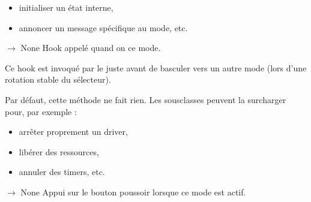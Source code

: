 \documentclass[letterpaper,10pt,french]{sphinxmanual}
\begin{document}
\begin{fulllineitems}
\begin{fulllineitems}
\begin{itemize}
\item {} 
\sphinxAtStartPar
initialiser un état interne,

\item {} 
\sphinxAtStartPar
annoncer un message spécifique au mode, etc.

\end{itemize}

\end{fulllineitems}


\begin{fulllineitems}
\label{\detokenize{api/core:core.mode_base.Mode.on_exit}}
\pysigstartsignatures
\pysiglinewithargsret
{}
{}
{{ $\rightarrow$ None}}
\pysigstopsignatures
\sphinxAtStartPar
Hook appelé quand on  ce mode.

\sphinxAtStartPar
Ce hook est invoqué par le  juste avant de basculer
vers un autre mode (lors d’une rotation stable du sélecteur).

\sphinxAtStartPar
Par défaut, cette méthode ne fait rien. Les sous\sphinxhyphen{}classes peuvent
la surcharger pour, par exemple :
\begin{itemize}
\item {} 
\sphinxAtStartPar
arrêter proprement un driver,

\item {} 
\sphinxAtStartPar
libérer des ressources,

\item {} 
\sphinxAtStartPar
annuler des timers, etc.

\end{itemize}

\end{fulllineitems}


\begin{fulllineitems}
\label{\detokenize{api/core:core.mode_base.Mode.on_short_press}}
\pysigstartsignatures
\pysiglinewithargsret
{}
{}
{{ $\rightarrow$ None}}
\pysigstopsignatures
\sphinxAtStartPar
Appui  sur le bouton poussoir lorsque ce mode est actif.


\end{fulllineitems}
\end{fulllineitems}
\end{document}
